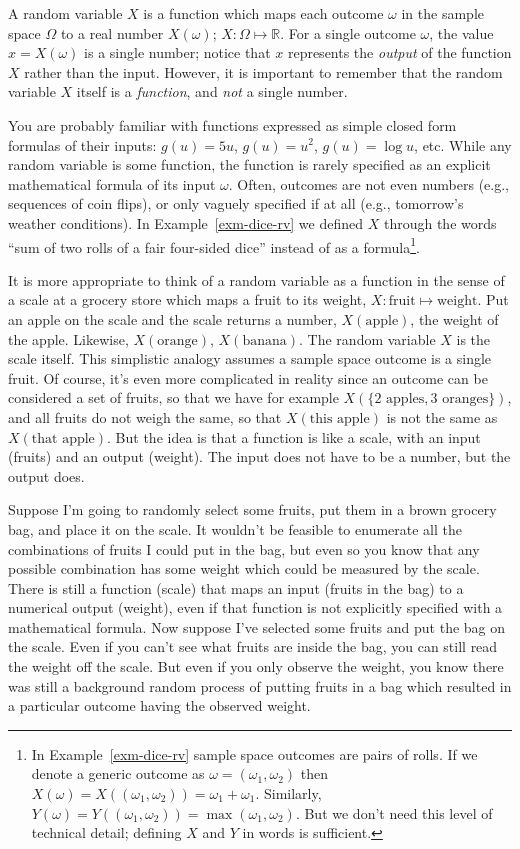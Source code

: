 \documentclass[
  letterpaper,
  DIV=11,
  numbers=noendperiod]{scrreprt}
\theoremstyle{plain}
\theoremstyle{definition}
\theoremstyle{definition}
\theoremstyle{definition}
\theoremstyle{remark}
\begin{document}
A random variable \(X\) is a function which maps each outcome \(\omega\)
in the sample space \(\Omega\) to a real number \(X(\omega)\);
\(X:\Omega\mapsto\mathbb{R}\). For a single outcome \(\omega\), the
value \(x = X(\omega)\) is a single number; notice that \(x\) represents
the \emph{output} of the function \(X\) rather than the input. However,
it is important to remember that the random variable \(X\) itself is a
\emph{function}, and \emph{not} a single number.

You are probably familiar with functions expressed as simple closed form
formulas of their inputs: \(g(u)=5u\), \(g(u)=u^2\), \(g(u)=\log u\),
etc. While any random variable is some function, the function is rarely
specified as an explicit mathematical formula of its input \(\omega\).
Often, outcomes are not even numbers (e.g., sequences of coin flips), or
only vaguely specified if at all (e.g., tomorrow's weather conditions).
In Example~\ref{exm-dice-rv} we defined \(X\) through the words ``sum of
two rolls of a fair four-sided dice'' instead of as a
formula\footnote{In Example~\ref{exm-dice-rv} sample space outcomes are
  pairs of rolls. If we denote a generic outcome as
  \(\omega = (\omega_1, \omega_2)\) then
  \(X(\omega) = X((\omega_1, \omega_2)) = \omega_1 + \omega_1\).
  Similarly,
  \(Y(\omega) = Y((\omega_1, \omega_2)) = \max(\omega_1, \omega_2)\).
  But we don't need this level of technical detail; defining \(X\) and
  \(Y\) in words is sufficient.}.

It is more appropriate to think of a random variable as a function in
the sense of a scale at a grocery store which maps a fruit to its
weight, \(X: \text{fruit}\mapsto\text{weight}\). Put an apple on the
scale and the scale returns a number, \(X(\text{apple})\), the weight of
the apple. Likewise, \(X(\text{orange})\), \(X(\text{banana})\). The
random variable \(X\) is the scale itself. This simplistic analogy
assumes a sample space outcome is a single fruit. Of course, it's even
more complicated in reality since an outcome can be considered a set of
fruits, so that we have for example
\(X(\{\text{2 apples}, \text{3 oranges}\})\), and all fruits do not
weigh the same, so that \(X(\text{this apple})\) is not the same as
\(X(\text{that apple})\). But the idea is that a function is like a
scale, with an input (fruits) and an output (weight). The input does not
have to be a number, but the output does.

Suppose I'm going to randomly select some fruits, put them in a brown
grocery bag, and place it on the scale. It wouldn't be feasible to
enumerate all the combinations of fruits I could put in the bag, but
even so you know that any possible combination has some weight which
could be measured by the scale. There is still a function (scale) that
maps an input (fruits in the bag) to a numerical output (weight), even
if that function is not explicitly specified with a mathematical
formula. Now suppose I've selected some fruits and put the bag on the
scale. Even if you can't see what fruits are inside the bag, you can
still read the weight off the scale. But even if you only observe the
weight, you know there was still a background random process of putting
fruits in a bag which resulted in a particular outcome having the
observed weight.
\end{document}
